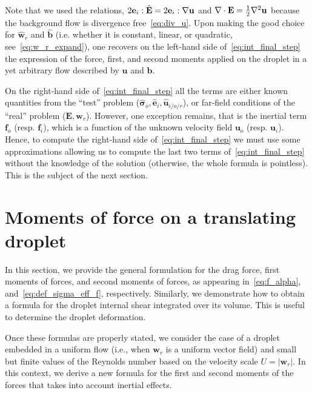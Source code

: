 Note that we used the relations, $2{\textbf{e}_i} : \hat{\textbf{E}} = 2{\textbf{e}_i} : {\mathbf{\nabla}\textbf{u}}$ and $\mathbf{\nabla}\cdot\textbf{E} = \frac{1}{2}\mathbf{\nabla}^2 \textbf{u}$ because the background flow is divergence free~\eqref{eq:div_u}. 
Upon making the good choice for $\hat{\textbf{w}}_r$ and $\hat{\textbf{b}}$ (i.e. whether it is constant, linear, or quadratic, see~\ref{eq:w_r_expand}), one recovers on the left-hand side of~\ref{eq:int_final_step} the expression of the force, first, and second moments applied on the droplet in a yet arbitrary flow described by $\textbf{u}$ and $\textbf{b}$. 

On the right-hand side of~\ref{eq:int_final_step} all the terms are either known quantities from the ``test'' problem ($\hat{\bm\sigma}_{o},\hat{\textbf{e}}_i, \hat{\textbf{u}}_{i/o/r}$), or far-field conditions of the ``real'' problem ($\textbf{E},\textbf{w}_r$). 
However, one exception remains, that is the inertial term $\textbf{f}_{o}$ (resp. $\textbf{f}_i$), which is a function of the unknown velocity field $\textbf{u}_{o}$ (resp. $\textbf{u}_i$). 
Hence, to compute the right-hand side of~\ref{eq:int_final_step} we must use some approximations allowing us to compute the last two terms of~\ref{eq:int_final_step} without the knowledge of the solution (otherwise, the whole formula is pointless). 
This is the subject of the next section. 




\section{Moments of force on a translating droplet}
\label{sec:compute_moments}
In this section, we provide the general formulation for the drag force, first moments of forces, and second moments of forces, as appearing in~\ref{eq:f_alpha}, and~\ref{eq:def_sigma_eff_f}, respectively. 
Similarly, we demonstrate how to obtain a formula for the droplet internal shear integrated over its volume.
This is  useful to determine the droplet deformation.  

Once these formulas are properly stated, we consider the case of a droplet embedded in a uniform flow (i.e., when $\textbf{w}_r$ is a uniform vector field) and small but finite values of the Reynolds number based on the velocity scale $U= |\textbf{w}_r|$. 
In this context, we derive a new formula for the first and second moments of the forces that takes into account inertial effects. 


